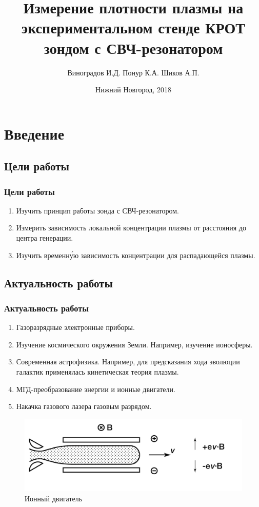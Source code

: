 \documentclass[10pt,pdf,hyperref={unicode}, dvipsnames]{beamer}
\title[Измерение плотности плазмы]{Измерение плотности плазмы на  экспериментальном стенде КРОТ зондом с СВЧ-резонатором}
\author{%
	Виноградов И.Д. %
	Понур К.А. %
	Шиков А.П. %
}
\institute{Радиофизический факультет ННГУ, 430 группа}
\date{Нижний Новгород, 2018}
\begin{document}
  
\begin{frame}
\titlepage
\end{frame}
\section{Введение}
\subsection{Цели работы}
\begin{frame}[t]
	\frametitle{Цели работы}
		\vfill
		\begin{enumerate}
			\item Изучить принцип работы зонда с СВЧ-резонатором.

			\item Измерить зависимость локальной концентрации плазмы			от расстояния до центра генерации.

			\item Изучить временн\'{у}ю зависимость концентрации для распадающейся плазмы.

		\end{enumerate}
		\vfill
\end{frame}
\subsection{Актуальность работы}
\begin{frame}[t]

	
	\frametitle{Актуальность работы}
		\vfill
		\begin{enumerate}
			\item Газоразрядные электронные приборы.
			\item Изучение космического окружения Земли. Например, изучение ионосферы.
			\item Современная астрофизика. Например, для предсказания хода эволюции галактик применялась кинетическая теория плазмы.
			\item МГД-преобразование энергии и ионные двигатели.

			\item Накачка газового лазера газовым разрядом.
		\end{enumerate}
			\begin{figure}[tb]
				\centering
				\includegraphics[width=0.8\linewidth]{fig/mgd}
				\caption*{Ионный двигатель}
				\label{fig:mgd}
			\end{figure}

\end{frame}
\end{document}
